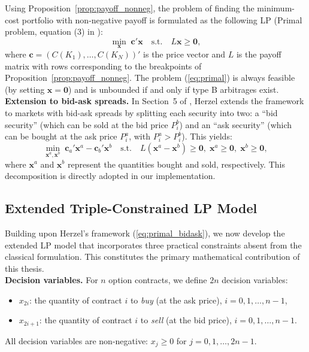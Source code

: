 \documentclass[openany]{book}
\numberwithin{figure}{chapter}
\numberwithin{equation}{chapter}
\begin{document}
Using Proposition~\ref{prop:payoff_nonneg}, the problem of finding the minimum-cost portfolio with non-negative payoff is formulated as the following LP (Primal problem, equation (3) in \cite{herzel2005}):
\begin{equation}
\min_{\mathbf{x}} \; \mathbf{c}'\mathbf{x} \quad \text{s.t.} \quad L\mathbf{x} \geq \mathbf{0},
\label{eq:primal}
\end{equation}
where $\mathbf{c} = (C(K_1), \ldots, C(K_N))'$ is the price vector and $L$ is the payoff matrix with rows corresponding to the breakpoints of Proposition~\ref{prop:payoff_nonneg}. The problem (\ref{eq:primal}) is always feasible (by setting $\mathbf{x} = \mathbf{0}$) and is unbounded if and only if type B arbitrages exist.\\

\textbf{Extension to bid-ask spreads.} In Section~5 of \cite{herzel2005}, Herzel extends the framework to markets with bid-ask spreads by splitting each security into two: a ``bid security'' (which can be sold at the bid price $P_i^b$) and an ``ask security'' (which can be bought at the ask price $P_i^a$, with $P_i^a > P_i^b$). This yields:
\begin{equation}
\min_{\mathbf{x}^a, \mathbf{x}^b} \; \mathbf{c}_a'\mathbf{x}^a - \mathbf{c}_b'\mathbf{x}^b \quad \text{s.t.} \quad L(\mathbf{x}^a - \mathbf{x}^b) \geq \mathbf{0}, \; \mathbf{x}^a \geq \mathbf{0}, \; \mathbf{x}^b \geq \mathbf{0},
\label{eq:primal_bidask}
\end{equation}
where $\mathbf{x}^a$ and $\mathbf{x}^b$ represent the quantities bought and sold, respectively. This decomposition is directly adopted in our implementation.

\subsection{Extended Triple-Constrained LP Model}

Building upon Herzel's framework (\ref{eq:primal_bidask}), we now develop the extended LP model that incorporates three practical constraints absent from the classical formulation. This constitutes the primary mathematical contribution of this thesis.\\

\textbf{Decision variables.} For $n$ option contracts, we define $2n$ decision variables:
\begin{itemize}
    \item $x_{2i}$: the quantity of contract $i$ to \textit{buy} (at the ask price), $i = 0, 1, \ldots, n-1$,
    \item $x_{2i+1}$: the quantity of contract $i$ to \textit{sell} (at the bid price), $i = 0, 1, \ldots, n-1$.
\end{itemize}
All decision variables are non-negative: $x_j \geq 0$ for $j = 0, 1, \ldots, 2n-1$.\\
\end{document}
